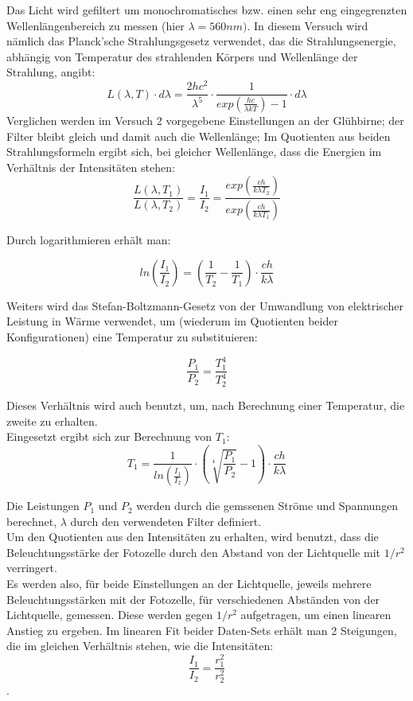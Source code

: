 \documentclass[12pt,a4paper]{article}
\begin{document}
\begin{multicols}{2}


Das Licht wird gefiltert um monochromatisches bzw. einen sehr eng eingegrenzten Wellenlängenbereich zu messen (hier $\lambda = 560nm)$. In diesem Versuch wird nämlich das Planck'sche Strahlungsgesetz verwendet, das die Strahlungsenergie, abhängig von Temperatur des strahlenden Körpers und Wellenlänge der Strahlung, angibt:
$$L(\lambda,T)\cdot d \lambda = \frac{2hc^2}{\lambda ^5}\cdot \frac{1}{exp(\frac{hc}{\lambda k T})-1}\cdot d\lambda$$
Verglichen werden im Versuch 2 vorgegebene Einstellungen an der Glühbirne; der Filter bleibt gleich und damit auch die Wellenlänge; Im Quotienten aus beiden Strahlungsformeln ergibt sich, bei gleicher Wellenlänge, dass die Energien im Verhältnis der Intensitäten stehen:
$$\frac{L(\lambda, T_1)}{L(\lambda, T_2)}=\frac{I_1}{I_2}=\frac{exp(\frac{ch}{k\lambda T_2})}{exp(\frac{ch}{k \lambda T_1})}$$

Durch logarithmieren erhält man:

$$ln(\frac{I_1}{I_2})=(\frac{1}{T_2}-\frac{1}{T_1})\cdot \frac{ch}{k\lambda}$$

Weiters wird das Stefan-Boltzmann-Gesetz von der Umwandlung von elektrischer Leistung in Wärme verwendet, um (wiederum im Quotienten beider Konfigurationen) eine Temperatur zu substituieren:

$$\frac{P_1}{P_2}=\frac{T_1^4}{T_2^4}$$

Dieses Verhältnis wird auch benutzt, um, nach Berechnung einer Temperatur, die zweite zu erhalten.\\
Eingesetzt ergibt sich zur Berechnung von $T_1$:
$$T_1=\frac{1}{ln(\frac{I_1}{I_2})}\cdot (\sqrt[4]{\frac{P_1}{P_2}}-1)\cdot \frac{ch}{k\lambda}$$


Die Leistungen $P_1$ und $P_2$ werden durch die gemssenen Ströme und Spannungen berechnet, 
$\lambda$ durch den verwendeten Filter definiert.\\
Um den Quotienten aus den Intensitäten zu erhalten, wird benutzt, dass die Beleuchtungsstärke der Fotozelle durch den Abstand von der Lichtquelle mit $1/r^2$ verringert.\\

Es werden also, für beide Einstellungen an der Lichtquelle, jeweils mehrere Beleuchtungsstärken mit der Fotozelle, für verschiedenen Abständen von der Lichtquelle, gemessen. Diese werden gegen $1/r^2$ aufgetragen, um einen linearen Anstieg zu ergeben. Im linearen Fit beider Daten-Sets erhält man 2 Steigungen, die im gleichen Verhältnis stehen, wie die Intensitäten:
$$\frac{I_1}{I_2}=\frac{r_1^2}{r_2^2}$$.



\end{multicols}
\end{document}
